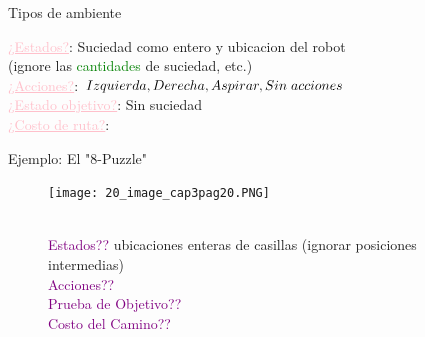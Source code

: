 \documentclass{beamer}
\theoremstyle{definition}
\theoremstyle{theorem}
\theoremstyle{remark}
\begin{document}

\begin{frame}{Tipos de ambiente}
    \small{
        \textcolor{Pink}{\underline{¿Estados?}}: Suciedad como entero y ubicacion del robot \\          \hspace{1.8cm} (ignore las \textcolor{Green}{cantidades} de suciedad, etc.) \\
        \textcolor{Pink}{\underline{¿Acciones?}}: \textcolor{Purple}{$Izquierda, Derecha, Aspirar, %
            Sin \hspace{0.1cm}acciones$} \\
        \textcolor{Pink}{\underline{¿Estado objetivo?}}: Sin suciedad \\
        \textcolor{Pink}{\underline{¿Costo de ruta?}}: 
    }
    \break\break\break\break\break
\end{frame}

\begin{frame}{Ejemplo: El "8-Puzzle"}
    \begin{figure}
        \centering
        \texttt{[image: 20\_image\_cap3pag20.PNG]}
        \begin{flushleft}
            \\ \textcolor{purple}{Estados??} ubicaciones enteras de casillas (ignorar posiciones intermedias)
            \\\textcolor{purple}{Acciones??}
            \\\textcolor{purple}{Prueba de Objetivo??}
            \\\textcolor{purple}{Costo del Camino??}
        \end{flushleft}
    \end{figure}{}
        
\end{frame}
\end{document}
